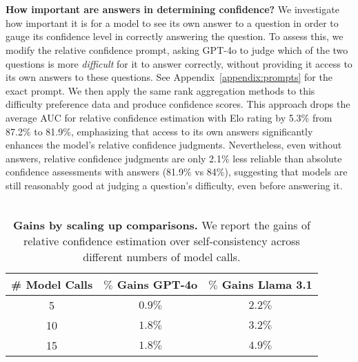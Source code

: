 \\\\
\noindent \textbf{How important are answers in determining confidence?} 
We investigate how important it is for a model to see its own answer to a question in order to gauge its confidence level in correctly answering the question. To assess this, we modify the relative confidence prompt, asking GPT-4o to judge which of the two questions is more \textit{difficult} for it to answer correctly, without providing it access to its own answers to these questions. See Appendix~\ref{appendix:prompts} for the exact prompt. We then apply the same rank aggregation methods to this difficulty preference data and produce confidence scores. This approach drops the average AUC for relative confidence estimation with Elo rating by 5.3\% from 87.2\% to 81.9\%, emphasizing that access to its own answers significantly enhances the model’s relative confidence judgments. Nevertheless, even without answers, relative confidence judgments are only 2.1\% less reliable than absolute confidence assessments with answers (81.9\% vs 84\%), suggesting that models are still reasonably good at judging a question's difficulty, even before answering it. \\\\

\begin{wraptable}{r}{0.55\textwidth}
\begin{tabular}{@{}ccc@{}}
\toprule
\# Model Calls & $\%$ Gains GPT-4o & $\%$ Gains Llama 3.1 \\ \midrule
5 & $0.9\%$ & $2.2\%$ \\
10 & $1.8\%$ & $3.2\%$ \\
15 & $1.8\%$ & $4.9\%$ \\ \bottomrule
\end{tabular}
\caption{\textbf{Gains by scaling up comparisons.} We report the gains of relative confidence estimation over self-consistency across different numbers of model calls. }
\label{tab:scaling_comparisons}
\end{wraptable}

